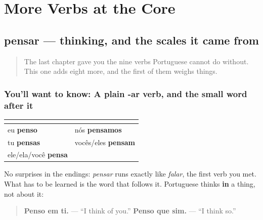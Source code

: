 
\chapter{More Verbs at the Core}
\label{ch:pt-more-core-verbs}

\section[pensar]{pensar — thinking, and the scales it came from}

\label{lesson:PT-C19-pensar}



\begin{quote}
The last chapter gave you the nine verbs Portuguese cannot do without. This one adds eight more, and the first of them weighs things.
\end{quote}

\subsection*{You'll want to know: A plain -ar verb, and the small word after it}
\noindent
\begin{tabularx}{\linewidth}{@{}>{\raggedright\arraybackslash}X>{\raggedright\arraybackslash}X@{}}
\toprule
\textbf{} & \textbf{} \\
\midrule
eu \textbf{penso} & nós \textbf{pensamos} \\
tu \textbf{pensas} & vocês/eles \textbf{pensam} \\
ele/ela/você \textbf{pensa} &  \\
\bottomrule
\end{tabularx}

No surprises in the endings: \emph{pensar} runs exactly like \emph{falar}, the first verb you met. What has to be learned is the word that follows it. Portuguese thinks \textbf{in} a thing, not about it:

\begin{quote}
\textbf{Penso em ti.} — \textquotedblleft{}I think of you.\textquotedblright{} \textbf{Penso que sim.} — \textquotedblleft{}I think so.\textquotedblright{}
\end{quote}

